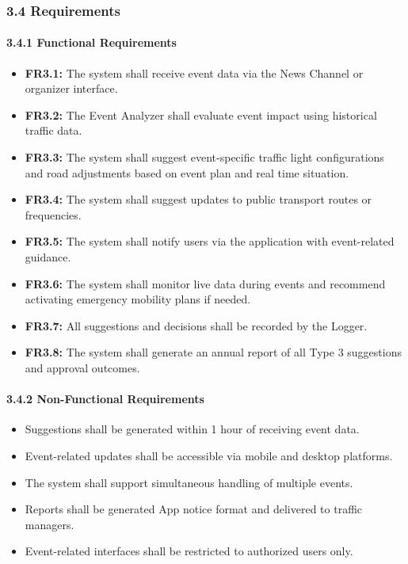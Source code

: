 \subsubsection*{3.4 Requirements}

\paragraph{3.4.1 Functional Requirements}

\begin{itemize}
    \item \textbf{FR3.1:} The system shall receive event data via the News Channel or organizer interface.
    \item \textbf{FR3.2:} The Event Analyzer shall evaluate event impact using historical traffic data.
    \item \textbf{FR3.3:} The system shall suggest event-specific traffic light configurations and road adjustments based on event plan and real time situation.
    \item \textbf{FR3.4:} The system shall suggest updates to public transport routes or frequencies.
    \item \textbf{FR3.5:} The system shall notify users via the application with event-related guidance.
    \item \textbf{FR3.6:} The system shall monitor live data during events and recommend activating emergency mobility plans if needed.
    \item \textbf{FR3.7:} All suggestions and decisions shall be recorded by the Logger.
    \item \textbf{FR3.8:} The system shall generate an annual report of all Type 3 suggestions and approval outcomes.
\end{itemize}

\paragraph{3.4.2 Non-Functional Requirements}

\begin{itemize}
    \item Suggestions shall be generated within 1 hour of receiving event data.
    \item Event-related updates shall be accessible via mobile and desktop platforms.
    \item The system shall support simultaneous handling of multiple events.
    \item Reports shall be generated App notice format and delivered to traffic managers.
    \item Event-related interfaces shall be restricted to authorized users only.
\end{itemize}
